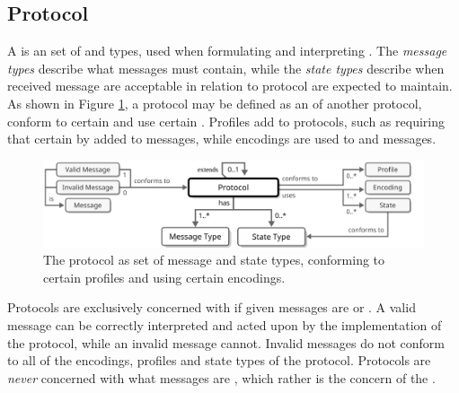 \subsection{Protocol}
\label{sec:concepts:protocol}

A  is an  set of  and  types, used when formulating and interpreting .
The \textit{message types} describe what  messages must contain, while the \textit{state types} describe when received message are acceptable in relation to  protocol  are expected to maintain.
As shown in Figure \ref{fig:protocol}, a protocol may be defined as an  of another protocol, conform to certain  and use certain .
Profiles add  to protocols, such as requiring that certain  by added to messages, while encodings are used to  and  messages.

\vfill

\begin{figure}[ht!]
  \centering
  \includegraphics[scale=0.9]{figures/protocol}
  \caption{
    The protocol as set of message and state types, conforming to certain profiles and using certain encodings.
  }
  \label{fig:protocol}
\end{figure}

\vfill

Protocols are exclusively concerned with if given messages are  or .
A valid message can be correctly interpreted and acted upon by the implementation of the protocol, while an invalid message cannot.
Invalid messages do not conform to all of the encodings, profiles and state types of the protocol.
Protocols are \textit{never} concerned with what messages are , which rather is the concern of the .

